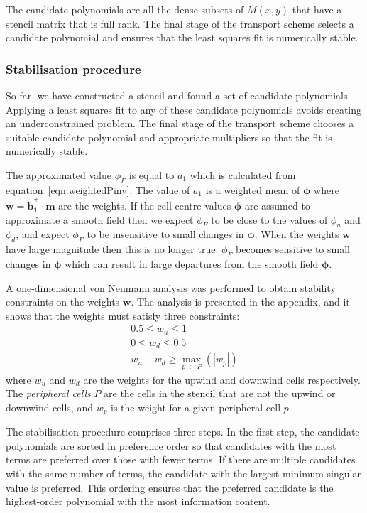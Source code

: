 The candidate polynomials are all the dense subsets of $M(x,y)$ that have a stencil matrix that is full rank.  The final stage of the transport scheme selects a candidate polynomial and ensures that the least squares fit is numerically stable.

\subsubsection{Stabilisation procedure}
So far, we have constructed a stencil and found a set of candidate polynomials.  Applying a least squares fit to any of these candidate polynomials avoids creating an underconstrained problem.  The final stage of the transport scheme chooses a suitable candidate polynomial and appropriate multipliers so that the fit is numerically stable.

The approximated value $\phi_F$ is equal to $a_1$ which is calculated from equation~\eqref{eqn:weightedPinv}.  The value of $a_1$ is a weighted mean of $\bm{\phi}$ where $\mathbf{w} = \mathbf{\tilde{b}_1^+} \cdot \mathbf{m}$ are the weights.
If the cell centre values $\bm{\phi}$ are assumed to approximate a smooth field then we expect $\phi_F$ to be close to the values of $\phi_u$ and $\phi_d$, and expect $\phi_F$ to be insensitive to small changes in $\bm{\phi}$.  When the weights $\mathbf{w}$ have large magnitude then this is no longer true: $\phi_F$ becomes sensitive to small changes in $\bm{\phi}$ which can result in large departures from the smooth field $\bm{\phi}$.

A one-dimensional von Neumann analysis was performed to obtain stability constraints on the weights $\mathbf{w}$.  The analysis is presented in the appendix, and it shows that the weights must satisfy three constraints:
\begin{subequations}
\label{eqn:stability}
\begin{align}
	0.5 \leq w_u \leq 1 \label{eqn:stabilityU} \\
	0 \leq w_d \leq 0.5 \label{eqn:stabilityD} \\
	w_u - w_d \geq \max_{p\:\in\:P}(|w_p|)
\end{align}
\end{subequations}
where $w_u$ and $w_d$ are the weights for the upwind and downwind cells respectively.  The \textit{peripheral cells} $P$ are the cells in the stencil that are not the upwind or downwind cells, and $w_p$ is the weight for a given peripheral cell $p$.

The stabilisation procedure comprises three steps.  In the first step, the candidate polynomials are sorted in preference order so that candidates with the most terms are preferred over those with fewer terms.
If there are multiple candidates with the same number of terms, the candidate with the largest minimum singular value is preferred.  This ordering ensures that the preferred candidate is the highest-order polynomial with the most information content.

